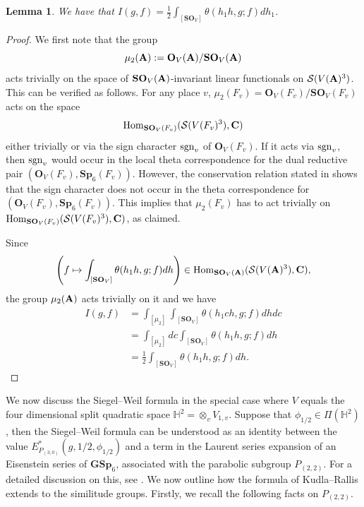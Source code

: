 \documentclass[11pt, reqno]{amsart}
\theoremstyle{plain}
\newtheorem{lemma}[theorem]{Lemma}
\theoremstyle{definition}
\theoremstyle{remark}
\theoremstyle{plain}
\def\C{{\bf C}}
\def\A{{\bf A}}
\def\GSp{{\mathbf{GSp}}}
\def\Sp{{\mathbf{Sp}}}
\def\SO{{\mathbf{SO}}}
\begin{document}
\begin{lemma}\label{Reduction:To:SO}
  We have that
     $I(g,f) = \frac{1}{2}\int_{[\mathbf{SO}_V]}\theta(h_1h,g;f)dh_1$.
\end{lemma}
\begin{proof}
  We first note that the group $$\mu_2(\A) := \mathbf{O}_V(\A)/\mathbf{SO}_V(\A)$$ acts trivially on the space of $\mathbf{SO}_V(\A)$-invariant linear functionals on $\mathcal{S}(V(\A)^3)$. This can be verified as follows. For any place $v$, $\mu_2(F_v) = \mathbf{O}_V(F_v)/\mathbf{SO}_V(F_v)$ acts on the space 
  $$\mathrm{Hom}_{\SO_V(F_v)}(\mathcal{S}(V(F_v)^3),\C)$$
  either trivially or via the sign character ${\rm sgn}_v$ of $\mathbf{O}_V(F_v)$. If it acts via ${\rm sgn}_v$, then ${\rm sgn}_v$ would occur in the local theta correspondence for the dual reductive pair $(\mathbf{O}_V(F_v),\Sp_6(F_v))$. However, the conservation relation stated in \cite[p. 11]{Conservation:Relation:Theta} shows that the sign character  does not occur in the theta correspondence for $(\mathbf{O}_V(F_v),\Sp_6(F_v))$. This implies that $\mu_2(F_v)$ has to act trivially on $\mathrm{Hom}_{\SO_V(F_v)}(\mathcal{S}(V(F_v)^3),\C)$, as claimed. 
   
   Since $$\left(f\mapsto \int_{[\SO_V]}\theta(h_1h,g;f) dh\right)\in \mathrm{Hom}_{\SO_V(\A)}(\mathcal{S}(V(\A)^3),\C),$$ the group $\mu_2(\A)$ acts trivially on it and we have
    \begin{align*}
    I(g,f) &= \int_{[\mu_2]}\int_{[\SO_V]}\theta(h_1 c h,g;f)dh dc\\
    &= \int_{[\mu_2]} d c \int_{[\SO_V]}\theta(h_1 h,g;f)dh\\
    &= \frac{1}{2}\int_{[\SO_V]}\theta(h_1 h,g;f)dh.
    \end{align*}
\end{proof}

We now discuss the Siegel--Weil formula in the special case where $V$ equals the four dimensional split quadratic space $\mathbb{H}^2= \otimes_v V_{1,v}$. Suppose that $\phi_{1/2} \in \Pi(\mathbb{H}^2)$, then the Siegel--Weil formula can be understood as an identity between the value $E_{P_{(3,0)}}^*(g, 1/2,\phi_{1/2})$ and a term in the Laurent series expansion of an Eisenstein series of $\GSp_6$, associated with the parabolic subgroup $P_{(2, 2)}$. For a detailed discussion on this, see \cite[\S 5.5 \& Theorem 6.1]{KudlaRallis}. We now outline how the formula of Kudla--Rallis extends to the similitude groups.  Firstly, we recall the following facts on $P_{(2, 2)}$. 
\end{document}
